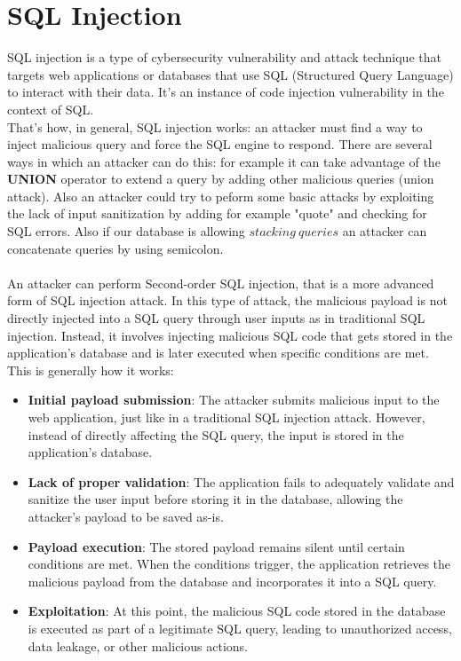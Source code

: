 \documentclass{article}
\begin{document}
	\section{SQL Injection}
	SQL injection is a type of cybersecurity vulnerability and attack technique that targets web applications or databases that use SQL (Structured Query Language) to interact with their data. It's an instance of code injection vulnerability in the context of SQL. \\
	That's how, in general, SQL injection works: an attacker must find a way to inject malicious query and force the SQL engine to respond. There are several ways in which an attacker can do this: for example it can take advantage of the \textbf{UNION} operator to extend a query by adding other malicious queries (union attack). Also an attacker could try to peform some basic attacks by exploiting the lack of input sanitization by adding for example "quote" and checking for SQL errors. Also if our database is allowing $stacking\ queries$ an attacker can concatenate queries by using semicolon.\\ \\
	An attacker can perform Second-order SQL injection, that is a more advanced form of SQL injection attack. In this type of attack, the malicious payload is not directly injected into a SQL query through user inputs as in traditional SQL injection. Instead, it involves injecting malicious SQL code that gets stored in the application's database and is later executed when specific conditions are met. This is generally how it works:
	\begin{itemize}
		\item \textbf{Initial payload submission}: The attacker submits malicious input to the web application, just like in a traditional SQL injection attack. However, instead of directly affecting the SQL query, the input is stored in the application's database.
		\item \textbf{Lack of proper validation}: The application fails to adequately validate and sanitize the user input before storing it in the database, allowing the attacker's payload to be saved as-is.
		\item \textbf{Payload execution}: The stored payload remains silent until certain conditions are met. When the conditions trigger, the application retrieves the malicious payload from the database and incorporates it into a SQL query.
		\item \textbf{Exploitation}: At this point, the malicious SQL code stored in the database is executed as part of a legitimate SQL query, leading to unauthorized access, data leakage, or other malicious actions.
	\end{itemize}
\end{document}
